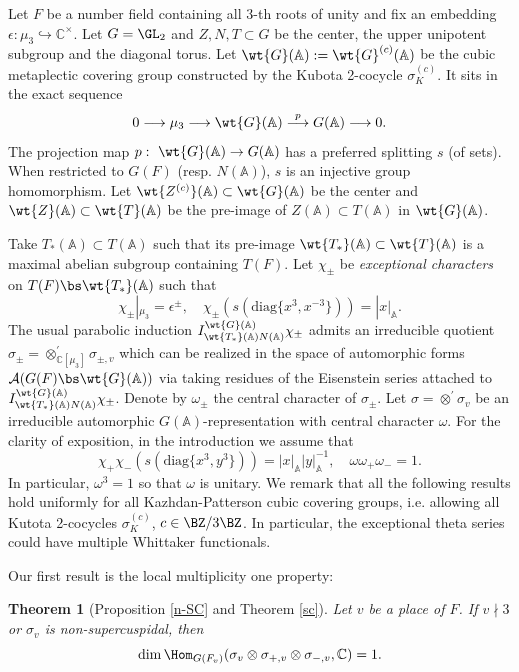 \documentclass[11pt,reqno]{amsart}
\newcommand{\BA}{{\mathbb {A}}} \newcommand{\BB}{{\mathbb {B}}}
\newcommand{\BC}{{\mathbb {C}}} \newcommand{\BD}{{\mathbb {D}}}
\newcommand{\CA}{{\mathcal {A}}} \newcommand{\CB}{{\mathcal {B}}}
\newcommand{\diag}{{\mathrm{diag}}}
\newcommand{\lra}{\longrightarrow}\newcommand{\lla}{\longleftarrow}
\theoremstyle{plain}
\newtheorem{thm}{Theorem}[section] \newtheorem{cor}[thm]{Corollary}
\theoremstyle{remark} \newtheorem{remark}[thm]{Remark}
\theoremstyle{definition} \newtheorem{exercise}[thm]{Exercise}
\theoremstyle{definition} \newtheorem{example}[thm]{Example} \newtheorem{condition}[thm]{Condition}
\numberwithin{equation}{section}
\renewcommand{\-}{\text{--}}
\begin{document}
Let $F$ be a number field containing  all $3$-th roots of  unity and fix an embedding $\epsilon: \mu_3\hookrightarrow \BC^\times$. Let $G=\GL_2$ and $Z, N, T\subset G$ be the center, the upper unipotent subgroup and the diagonal torus.  Let $\wt{G}(\BA):=\wt{G}^{(c)}(\BA)$ be the cubic metaplectic covering group constructed by the Kubota 2-cocycle $\sigma_K^{(c)}$. It sits in the exact sequence
    \[0\lra\mu_3\lra \wt{G}(\BA)\stackrel{p}{\lra} G(\BA)\lra 0.\]
    The projection map  $p:\ \wt{G}(\BA)\to G(\BA)$ has a preferred splitting $s$ (of sets).  When  restricted to 
$G(F)$ (resp. $N(\BA)$), $s$ is an injective group homomorphism.  Let $\wt{Z^{(c)}}(\BA)\subset \wt{G}(\BA)$ be the center and $\wt{Z}(\BA)\subset \wt{T}(\BA)$ be the pre-image of $Z(\BA)\subset T(\BA)$ in $\wt{G}(\BA)$. 

Take $T_*(\BA)\subset T(\BA)$ such that  its pre-image $\wt{T_*}(\BA)\subset \wt{T}(\BA)$ is a maximal abelian subgroup  containing $T(F)$.  Let $\chi_{\pm}$ be {\em exceptional characters} on $T(F)\bs \wt{T_*}(\BA)$ such that \[\chi_{\pm}|_{\mu_3}=\epsilon^\pm, \quad 
\chi_\pm(s(\diag\{x^3,x^{-3}\}))=|x|_{\BA}.\]  The usual parabolic induction $I_{\wt{T_*}(\BA)N(\BA)}^{\wt{G}(\BA)}\chi_\pm$ admits an irreducible quotient $\sigma_\pm=\otimes_{\BC[\mu_3]}^\prime \sigma_{\pm,v}$ which  can be realized in the space of automorphic forms $\CA(G(F)\bs \wt{G}(\BA))$ via taking residues of the Eisenstein series attached to $I_{\wt{T_*}(\BA)N(\BA)}^{\wt{G}(\BA)}\chi_\pm$.
 Denote by $\omega_{\pm}$ the central character of $\sigma_{\pm}$.  Let $\sigma=\otimes^\prime\sigma_v$ be an irreducible  automorphic $G(\BA)$-representation with central character $\omega$. For the clarity of  exposition, in the introduction we assume that
 \[\chi_+\chi_-(s(\diag\{x^3,y^3\}))=|x|_\BA|y|_\BA^{-1}, \quad \omega\omega_+\omega_-=1.\]
In particular, $\omega^3 = 1$ so that $\omega$ is unitary.  We remark that all the following  results hold uniformly for all Kazhdan-Patterson cubic covering groups, i.e. allowing all Kutota 2-cocycles $\sigma_K^{(c)}$, $c\in\BZ/3\BZ$. In particular,   the exceptional theta series could have multiple  Whittaker functionals.

Our first result is the local multiplicity one property:
\begin{thm}[Proposition \ref{n-SC} and Theorem \ref{sc}] \label{Mulone} Let $v$ be a place of $F$. If $v\nmid 3$ or $\sigma_v$ is non-supercuspidal, then
\[\dim \Hom_{G(F_v)}(\sigma_v\otimes\sigma_{+,v}\otimes \sigma_{-,v},\BC)=1.\]
\end{thm}
 
\end{document}
